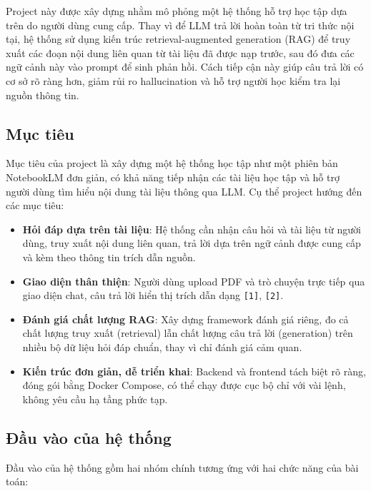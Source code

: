 \documentclass[12pt]{ai_conquer2026}
\begin{document}
Project này được xây dựng nhằm mô phỏng một hệ thống hỗ trợ học tập dựa trên do người dùng cung cấp. Thay vì để LLM trả lời hoàn toàn từ tri thức nội tại, hệ thống sử dụng kiến trúc retrieval-augmented generation (RAG) để truy xuất các đoạn nội dung liên quan từ tài liệu đã được nạp trước, sau đó đưa các ngữ cảnh này vào prompt để sinh phản hồi. Cách tiếp cận này giúp câu trả lời có cơ sở rõ ràng hơn, giảm rủi ro hallucination và hỗ trợ người học kiểm tra lại nguồn thông tin.

\subsection{Mục tiêu}

Mục tiêu của project là xây dựng một hệ thống học tập như một phiên bản NotebookLM đơn
giản, có khả năng tiếp nhận các tài liệu học tập và hỗ trợ người dùng tìm hiểu nội dung tài liệu
thông qua LLM. Cụ thể project hướng đến các mục tiêu:
\begin{itemize}
    \item \textbf{Hỏi đáp dựa trên tài liệu}: Hệ thống cần nhận câu hỏi và tài liệu từ người dùng, truy xuất nội dung liên quan, trả lời dựa trên ngữ cảnh được cung cấp và kèm theo thông tin trích dẫn nguồn.
    \item \textbf{Giao diện thân thiện}: Người dùng upload PDF và trò chuyện trực tiếp qua giao diện chat, câu trả lời hiển thị trích dẫn dạng \texttt{[1]}, \texttt{[2]}.
    \item \textbf{Đánh giá chất lượng RAG}: Xây dựng framework đánh giá riêng, đo cả chất lượng truy xuất (retrieval) lẫn chất lượng câu trả lời (generation) trên nhiều bộ dữ liệu hỏi đáp chuẩn, thay vì chỉ đánh giá cảm quan.
    \item \textbf{Kiến trúc đơn giản, dễ triển khai}: Backend và frontend tách biệt rõ ràng, đóng gói bằng Docker Compose, có thể chạy được cục bộ chỉ với vài lệnh, không yêu cầu hạ tầng phức tạp.
\end{itemize}


\subsection{Đầu vào của hệ thống}

Đầu vào của hệ thống gồm hai nhóm chính tương ứng với hai chức năng của bài toán:
\end{document}
